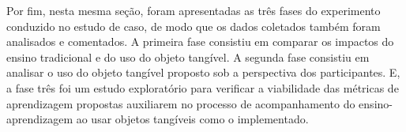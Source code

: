 Por fim, nesta mesma seção, foram apresentadas as três fases do experimento conduzido no estudo de caso, de modo que os dados coletados também foram analisados e comentados. A primeira fase consistiu em comparar os impactos do ensino tradicional e do uso do objeto tangível. A segunda fase consistiu em analisar o uso do objeto tangível proposto sob a perspectiva dos participantes. E, a fase três foi um estudo exploratório para verificar a viabilidade das métricas de aprendizagem propostas auxiliarem no processo de acompanhamento do ensino-aprendizagem ao usar objetos tangíveis como o implementado.